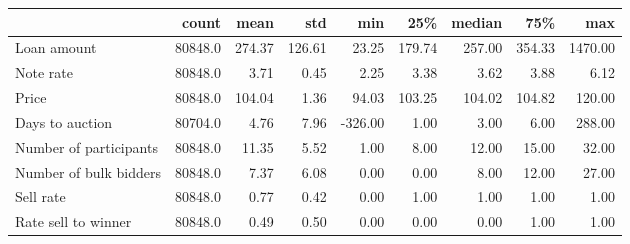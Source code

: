 \begin{tabular}{lrrrrrrrr}
\toprule
{} &    count &    mean &     std &     min &     25\% &  median &     75\% &      max \\
\midrule
Loan amount            &  80848.0 &  274.37 &  126.61 &   23.25 &  179.74 &  257.00 &  354.33 &  1470.00 \\
Note rate              &  80848.0 &    3.71 &    0.45 &    2.25 &    3.38 &    3.62 &    3.88 &     6.12 \\
Price                  &  80848.0 &  104.04 &    1.36 &   94.03 &  103.25 &  104.02 &  104.82 &   120.00 \\
Days to auction        &  80704.0 &    4.76 &    7.96 & -326.00 &    1.00 &    3.00 &    6.00 &   288.00 \\
Number of participants &  80848.0 &   11.35 &    5.52 &    1.00 &    8.00 &   12.00 &   15.00 &    32.00 \\
Number of bulk bidders &  80848.0 &    7.37 &    6.08 &    0.00 &    0.00 &    8.00 &   12.00 &    27.00 \\
Sell rate              &  80848.0 &    0.77 &    0.42 &    0.00 &    1.00 &    1.00 &    1.00 &     1.00 \\
Rate sell to winner    &  80848.0 &    0.49 &    0.50 &    0.00 &    0.00 &    0.00 &    1.00 &     1.00 \\
\bottomrule
\end{tabular}
